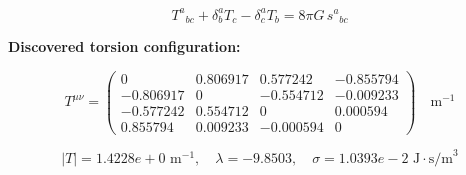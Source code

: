 
\begin{equation}
  T^a{}_{bc} + \delta^a_b T_c - \delta^a_c T_b = 8\pi G \, s^a{}_{bc}
\end{equation}

\textbf{Discovered torsion configuration:}

\begin{equation}
  T^{\mu\nu} = \begin{pmatrix}
    0 & 0.806917 & 0.577242 & -0.855794 \\
    -0.806917 & 0 & -0.554712 & -0.009233 \\
    -0.577242 & 0.554712 & 0 & 0.000594 \\
    0.855794 & 0.009233 & -0.000594 & 0
  \end{pmatrix} \quad \text{m}^{-1}
\end{equation}

\begin{equation}
  |T| = 1.4228e+0 \text{ m}^{-1}, \quad
  \lambda = -9.8503, \quad
  \sigma = 1.0393e-2 \text{ J}\cdot\text{s/m}^3
\end{equation}
